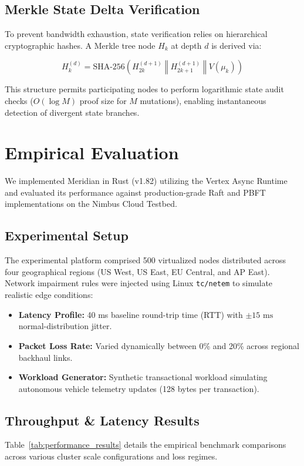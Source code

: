 \documentclass[10pt,a4paper]{article}
\begin{document}
\subsection{Merkle State Delta Verification}
To prevent bandwidth exhaustion, state verification relies on hierarchical cryptographic hashes. A Merkle tree node $H_k$ at depth $d$ is derived via:

\begin{equation}
  H_k^{(d)} = \text{SHA-256}\left( H_{2k}^{(d+1)} \;\mathbin{\Vert}\; H_{2k+1}^{(d+1)} \;\mathbin{\Vert}\; V(\mu_k) \right)
\end{equation}

This structure permits participating nodes to perform logarithmic state audit checks ($O(\log M)$ proof size for $M$ mutations), enabling instantaneous detection of divergent state branches.

\section{Empirical Evaluation}
We implemented Meridian in Rust (v1.82) utilizing the Vertex Async Runtime and evaluated its performance against production-grade Raft and PBFT implementations on the Nimbus Cloud Testbed.

\subsection{Experimental Setup}
The experimental platform comprised 500 virtualized nodes distributed across four geographical regions (US West, US East, EU Central, and AP East). Network impairment rules were injected using Linux \texttt{tc/netem} to simulate realistic edge conditions:
\begin{itemize}
  \item \textbf{Latency Profile:} 40 ms baseline round-trip time (RTT) with $\pm 15\text{ ms}$ normal-distribution jitter.
  \item \textbf{Packet Loss Rate:} Varied dynamically between 0\% and 20\% across regional backhaul links.
  \item \textbf{Workload Generator:} Synthetic transactional workload simulating autonomous vehicle telemetry updates (128 bytes per transaction).
\end{itemize}

\subsection{Throughput \& Latency Results}
Table~\ref{tab:performance_results} details the empirical benchmark comparisons across various cluster scale configurations and loss regimes.
\end{document}
